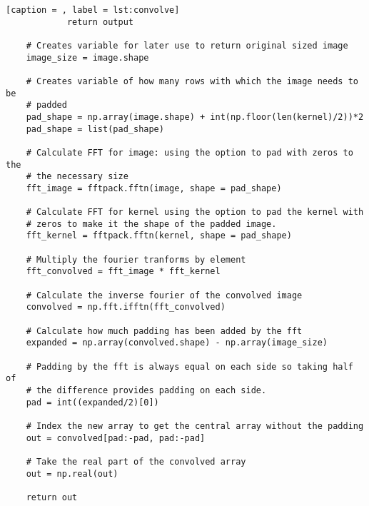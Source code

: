 \documentclass[a4paper,10pt]{article}
\begin{document}
\begin{lstlisting}[caption = , label = lst:convolve]
            return output

    # Creates variable for later use to return original sized image
    image_size = image.shape

    # Creates variable of how many rows with which the image needs to be
    # padded
    pad_shape = np.array(image.shape) + int(np.floor(len(kernel)/2))*2
    pad_shape = list(pad_shape)

    # Calculate FFT for image: using the option to pad with zeros to the
    # the necessary size
    fft_image = fftpack.fftn(image, shape = pad_shape)

    # Calculate FFT for kernel using the option to pad the kernel with
    # zeros to make it the shape of the padded image.
    fft_kernel = fftpack.fftn(kernel, shape = pad_shape)

    # Multiply the fourier tranforms by element
    fft_convolved = fft_image * fft_kernel

    # Calculate the inverse fourier of the convolved image
    convolved = np.fft.ifftn(fft_convolved)

    # Calculate how much padding has been added by the fft
    expanded = np.array(convolved.shape) - np.array(image_size)

    # Padding by the fft is always equal on each side so taking half of
    # the difference provides padding on each side.
    pad = int((expanded/2)[0])

    # Index the new array to get the central array without the padding
    out = convolved[pad:-pad, pad:-pad]

    # Take the real part of the convolved array
    out = np.real(out)

    return out
\end{lstlisting}
\end{document}
